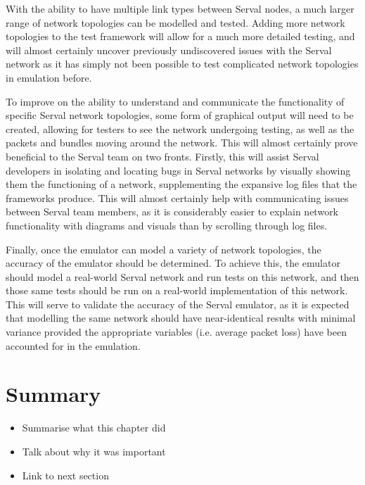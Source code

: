With the ability to have multiple link types between Serval nodes, a much larger range of network topologies can be modelled and tested.
Adding more network topologies to the test framework will allow for a much more detailed testing, and will almost certainly uncover previously undiscovered issues with the Serval network as it has simply not been possible to test complicated network topologies in emulation before.

To improve on the ability to understand and communicate the functionality of specific Serval network topologies, some form of graphical output will need to be created, allowing for testers to see the network undergoing testing, as well as the packets and bundles moving around the network.
This will almost certainly prove beneficial to the Serval team on two fronts. 
Firstly, this will assist Serval developers in isolating and locating bugs in Serval networks by visually showing them the functioning of a network, supplementing the expansive log files that the frameworks produce.
This will almost certainly help with communicating issues between Serval team members, as it is considerably easier to explain network functionality with diagrams and visuals than by scrolling through log files.

Finally, once the emulator can model a variety of network topologies, the accuracy of the emulator should be determined.
To achieve this, the emulator should model a real-world Serval network and run tests on this network, and then those same tests should be run on a real-world implementation of this network.
This will serve to validate the accuracy of the Serval emulator, as it is expected that modelling the same network should have near-identical results with minimal variance provided the appropriate variables (i.e. average packet loss) have been accounted for in the emulation.

\section{Summary}
\begin{itemize}
    \item Summarise what this chapter did
    \item Talk about why it was important
    \item Link to next section
\end{itemize}
